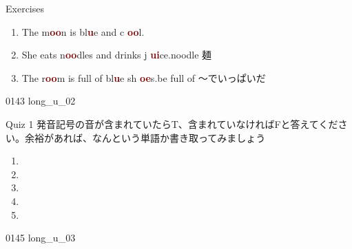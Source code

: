 \documentclass[aspectratio=169, xcolor={dvipsnames,table}]{beamer}
\begin{document}
\begin{frame}[plain]{Exercises }
  \LARGE
  \begin{enumerate}[<+->]
    \item The m\textcolor{Maroon}{\bfseries oo}n is bl\textcolor{Maroon}{\bfseries u}e and c\textcolor{Maroon}{\bfseries
            oo}l.

    \item She eats n\textcolor{Maroon}{\bfseries oo}dles and drinks j\textcolor{Maroon}{\bfseries
            ui}ce.\hfill{\scriptsize noodle  麺}

    \item The r\textcolor{Maroon}{\bfseries oo}m is full of bl\textcolor{Maroon}{\bfseries u}e sh\textcolor{Maroon}{\bfseries
            oe}s.\hfill{\scriptsize be full of ～でいっぱいだ}
  \end{enumerate}
  \hfill{\tiny 0143}\,{\scriptsize {}\,{\tiny long\_u\_02}}
\end{frame}
\begin{frame}[plain]{Quiz 1}
  発音記号の音が含まれていたらT、含まれていなければFと答えてください。余裕があれば、なんという単語か書き取ってみましょう

  \LARGE
  \begin{enumerate}
    \item \mbox{}\hspace{40pt}\hspace{150pt}\mbox{}

    \item \mbox{}\hspace{40pt}\hspace{150pt}\mbox{}

    \item \mbox{}\hspace{40pt}\hspace{150pt}\mbox{}

    \item \mbox{}\hspace{40pt}\hspace{150pt}\mbox{}

    \item \mbox{}\hspace{40pt}\hspace{150pt}\mbox{}
  \end{enumerate}
  \hfill{\tiny 0145}\,{\scriptsize {}\,{\tiny long\_u\_03}}
\end{frame}
\end{document}
